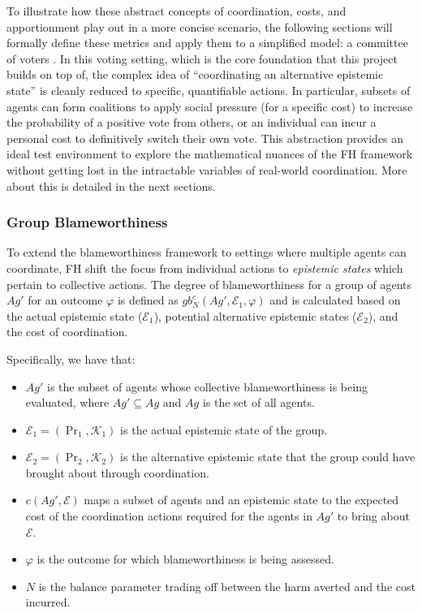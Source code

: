 \documentclass{article}
\begin{document}
To illustrate how these abstract concepts of coordination, costs, and apportionment play out in a more concise scenario, the following sections will formally define these metrics and apply them to a simplified model: a committee of voters \cite{friedenberg_blameworthiness_2019}. In this voting setting, which is the core foundation that this project builds on top of, the complex idea of ``coordinating an alternative epistemic state'' is cleanly reduced to specific, quantifiable actions. In particular, subsets of agents can form coalitions to apply social pressure (for a specific cost) to increase the probability of a positive vote from others, or an individual can incur a personal cost to definitively switch their own vote. This abstraction provides an ideal test environment to explore the mathematical nuances of the FH framework without getting lost in the intractable variables of real-world coordination. More about this is detailed in the next sections.

\subsubsection{Group Blameworthiness}

To extend the blameworthiness framework to settings where multiple agents can coordinate, FH shift the focus from individual actions to \textit{epistemic states} which pertain to collective actions. The degree of blameworthiness for a group of agents $Ag'$ for an outcome $\varphi$ is defined as $gb^c_N(Ag',\mathcal{E}_1,\varphi)$ and is calculated based on the actual epistemic state ($\mathcal{E}_1$), potential alternative epistemic states ($\mathcal{E}_2$), and the cost of coordination.

Specifically, we have that:

\begin{itemize}
  \item $Ag'$ is the subset of agents whose collective blameworthiness is being evaluated, where $Ag' \subseteq Ag$ and $Ag$ is the set of all agents.
  \item $\mathcal{E}_1 = (\Pr_1, \mathcal{K}_1)$ is the actual epistemic state of the group.
  \item $\mathcal{E}_2 = (\Pr_2, \mathcal{K}_2)$ is the alternative epistemic state that the group could have brought about through coordination.
  \item $c(Ag', \mathcal{E})$ maps a subset of agents and an epistemic state to the expected cost of the coordination actions required for the agents in $Ag'$ to bring about $\mathcal{E}$.
  \item $\varphi$ is the outcome for which blameworthiness is being assessed.
  \item $N$ is the balance parameter trading off between the harm averted and the cost incurred.
\end{itemize}
\end{document}
